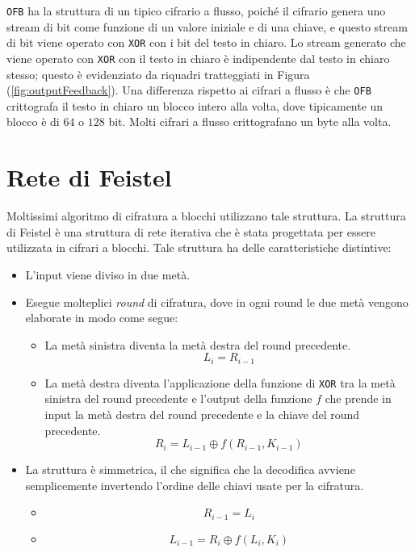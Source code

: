 \verb|OFB| ha la struttura di un tipico cifrario a flusso, poiché il cifrario
genera uno stream di bit come funzione di un valore iniziale e di una chiave,
e questo stream di bit viene operato con \verb|XOR| con i bit del testo in chiaro.
Lo stream generato che viene operato con \verb|XOR| con il testo in chiaro è
indipendente dal testo in chiaro stesso; questo è evidenziato da riquadri
tratteggiati in Figura (\ref{fig:outputFeedback}). Una differenza rispetto
ai cifrari a flusso è che \verb|OFB| crittografa il testo in chiaro un blocco
intero alla volta, dove tipicamente un blocco è di $64$ o $128$ bit. Molti
cifrari a flusso crittografano un byte alla volta.

\section{Rete di Feistel}
Moltissimi algoritmo di cifratura a blocchi utilizzano tale struttura.
La struttura di Feistel è una struttura di rete iterativa che è stata
progettata per essere utilizzata in cifrari a blocchi.
Tale struttura ha delle caratteristiche distintive:
\begin{itemize}
    \item L'input viene diviso in due metà.
    \item Esegue molteplici \textit{round} di cifratura, dove in ogni round 
    le due metà vengono elaborate in modo come segue:
    \begin{itemize}
        \item La metà sinistra diventa la metà destra del round precedente.
        \[
          L_i = R_{i-1}  
        \]
        \item La metà destra diventa l'applicazione della funzione di \texttt{XOR}
        tra la metà sinistra del round precedente e l'output della funzione $f$ che prende 
        in input la metà destra del round precedente e la chiave del round precedente.
        \[
            R_i = L_{i-1} \oplus f(R_{i-1}, K_{i-1})
        \]
    \end{itemize}
    \item La struttura è simmetrica, il che significa che la decodifica 
    avviene semplicemente invertendo l'ordine delle chiavi usate per la cifratura.
    \begin{itemize}
        \item \[ R_{i-1} = L_i \]
        \item \[L_{i-1} = R_i \oplus f(L_i, K_i)\]
    \end{itemize}
\end{itemize}
